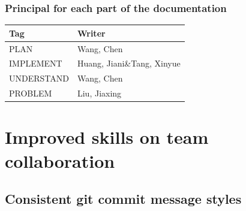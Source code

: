 \documentclass[a4paper]{report}
\begin{document}
\subsection{Principal for each part of the documentation}
\begin{table}[htbp]
\center
\begin{tabular}{|l|l|}
\hline
\textbf{Tag} & \textbf{Writer} \\ \hline
 PLAN&Wang, Chen\\ \hline
 IMPLEMENT&Huang, Jiani\&Tang, Xinyue\\ \hline
 UNDERSTAND&Wang, Chen\\ \hline
 PROBLEM&Liu, Jiaxing\\ \hline
\end{tabular}
\end{table}



\chapter{Improved skills on team collaboration}
\section{Consistent git commit message styles}
\end{document}

